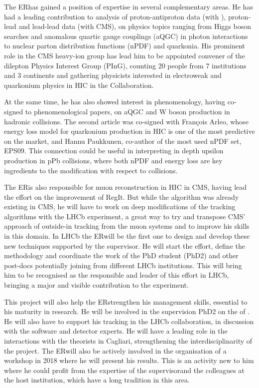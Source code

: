 \documentclass[a4paper,11pt]{article}
\newcommand{\ER}{ER}
\newcommand{\supervisor}{the supervisor}
\begin{document}
The \ER has gained a position of expertise in several complementary areas. He has had a leading contribution to analysis of proton-antiproton data (with \DO), proton-lead and lead-lead data (with CMS), on physics topics ranging from Higgs boson searches and anomalous quartic gauge couplings (aQGC) in photon interactions to nuclear parton distribution functions (nPDF) and quarkonia. His prominent role in the CMS heavy-ion group has lead him to be appointed convener of the dilepton Physics Interest Group (PInG), counting 20 people from 7 institutions and 3 continents and gathering physicists interested in electroweak and quarkonium physics in HIC in the Collaboration.

At the same time, he has also showed interest in phenomenology, having co-signed to phenomenological papers, on aQGC and W boson production in hadronic collisions. The second article was co-signed with François Arleo, whose energy loss model for quarkonium production in HIC is one of the most predictive on the market, and Hannu Paukkunen, co-author of the most used nPDF set, EPS09. This connection could be useful in interpreting in depth upsilon production in pPb collisions, where both nPDF and energy loss are key ingredients to the modification with respect to \pp collisions.

The \ER is also responsible for muon reconstruction in HIC in CMS,
having lead the effort on the improvement of RegIt. But while the
algorithm was already existing in CMS, he will have to work on deep
modifications of the tracking algorithms with the LHCb experiment, a
great way to try and transpose CMS' approach of outside-in tracking
from the muon systems and to improve his skills in this domain. In 
LHCb the \ER will be the first one to design and develop these new
techniques supported by the supervisor. He will start the effort, define 
the methodology and coordinate the work of the PhD student (PhD2) and other 
post-docs potentially joining from different LHCb institutions.
This will bring him to be recognised as the responsible and leader 
of this effort
in LHCb, bringing a major and visible contribution to the experiment.

This project will also help the \ER strengthen his management skills, essential to his maturity in research. He will be involved in the supervision PhD2 on the \rpa of \PgUabc. He will also have to support his \pbpb tracking in the LHCb collaboration, in discussion with the software and detector experts. He will 
have a leading role in the interactions with the theorists in Cagliari, strengthening the interdisciplinarity of the project. The \ER will also be actively involved in the organisation of a workshop in 2018 where he will present his 
results. This is an activity new to him where he could profit from the 
expertise of \supervisor and the colleagues at the host institution, which 
have a long tradition in this area.
\end{document}

